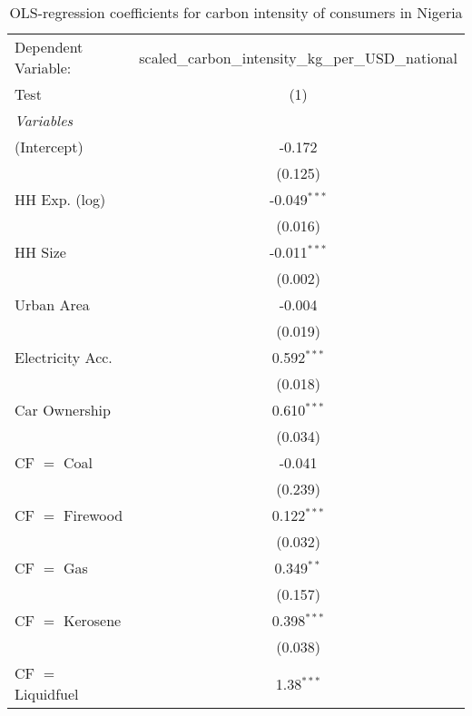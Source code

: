 
\begin{table}[htbp!]
   \centering
   \small
   \begin{adjustbox}{width = 1\textwidth, max height = 0.95\textheight, center}
      \begin{threeparttable}[b]
         \caption{\label{tab:OLS_1_NGA} OLS-regression coefficients for carbon intensity of consumers in Nigeria}
         \begin{tabular}{lc}
            \tabularnewline \midrule \midrule
            Dependent Variable: & scaled\_carbon\_intensity\_kg\_per\_USD\_national\\        
            Test                & (1)\\  
            \midrule
            \emph{Variables}\\
            (Intercept)         & -0.172\\   
                                & (0.125)\\   
            HH Exp. (log)       & -0.049$^{***}$\\   
                                & (0.016)\\   
            HH Size             & -0.011$^{***}$\\   
                                & (0.002)\\   
            Urban Area          & -0.004\\   
                                & (0.019)\\   
            Electricity Acc.    & 0.592$^{***}$\\   
                                & (0.018)\\   
            Car Ownership       & 0.610$^{***}$\\   
                                & (0.034)\\   
            CF $=$ Coal         & -0.041\\   
                                & (0.239)\\   
            CF $=$ Firewood     & 0.122$^{***}$\\   
                                & (0.032)\\   
            CF $=$ Gas          & 0.349$^{**}$\\   
                                & (0.157)\\   
            CF $=$ Kerosene     & 0.398$^{***}$\\   
                                & (0.038)\\   
            CF $=$ Liquidfuel   & 1.38$^{***}$\\   

\end{tabular}
\end{threeparttable}
\end{adjustbox}
\end{table}
